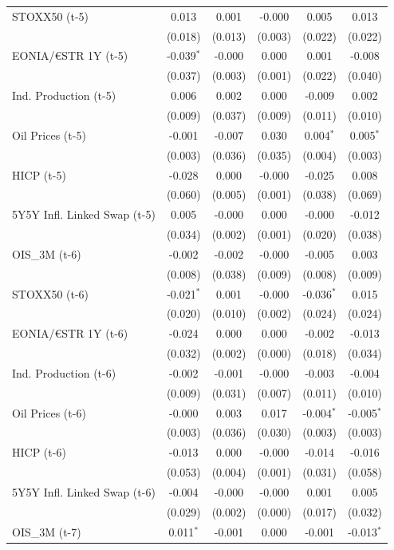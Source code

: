 \begin{longtable}[t]{lccccc}
STOXX50 (t-5) & 0.013 & 0.001 & -0.000 & 0.005 & 0.013\\
 & (0.018) & (0.013) & (0.003) & (0.022) & (0.022)\\
EONIA/€STR 1Y (t-5) & -0.039$^{*}$ & -0.000 & 0.000 & 0.001 & -0.008\\
 & (0.037) & (0.003) & (0.001) & (0.022) & (0.040)\\
Ind. Production (t-5) & 0.006 & 0.002 & 0.000 & -0.009 & 0.002\\
 & (0.009) & (0.037) & (0.009) & (0.011) & (0.010)\\
Oil Prices (t-5) & -0.001 & -0.007 & 0.030 & 0.004$^{*}$ & 0.005$^{*}$\\
 & (0.003) & (0.036) & (0.035) & (0.004) & (0.003)\\
HICP (t-5) & -0.028 & 0.000 & -0.000 & -0.025 & 0.008\\
 & (0.060) & (0.005) & (0.001) & (0.038) & (0.069)\\
5Y5Y Infl. Linked Swap (t-5) & 0.005 & -0.000 & 0.000 & -0.000 & -0.012\\
 & (0.034) & (0.002) & (0.001) & (0.020) & (0.038)\\
OIS\_3M (t-6) & -0.002 & -0.002 & -0.000 & -0.005 & 0.003\\
 & (0.008) & (0.038) & (0.009) & (0.008) & (0.009)\\
STOXX50 (t-6) & -0.021$^{*}$ & 0.001 & -0.000 & -0.036$^{*}$ & 0.015\\
 & (0.020) & (0.010) & (0.002) & (0.024) & (0.024)\\
EONIA/€STR 1Y (t-6) & -0.024 & 0.000 & 0.000 & -0.002 & -0.013\\
 & (0.032) & (0.002) & (0.000) & (0.018) & (0.034)\\
Ind. Production (t-6) & -0.002 & -0.001 & -0.000 & -0.003 & -0.004\\
 & (0.009) & (0.031) & (0.007) & (0.011) & (0.010)\\
Oil Prices (t-6) & -0.000 & 0.003 & 0.017 & -0.004$^{*}$ & -0.005$^{*}$\\
 & (0.003) & (0.036) & (0.030) & (0.003) & (0.003)\\
HICP (t-6) & -0.013 & 0.000 & -0.000 & -0.014 & -0.016\\
 & (0.053) & (0.004) & (0.001) & (0.031) & (0.058)\\
5Y5Y Infl. Linked Swap (t-6) & -0.004 & -0.000 & -0.000 & 0.001 & 0.005\\
 & (0.029) & (0.002) & (0.000) & (0.017) & (0.032)\\
OIS\_3M (t-7) & 0.011$^{*}$ & -0.001 & 0.000 & -0.001 & -0.013$^{*}$\\

\end{longtable}
